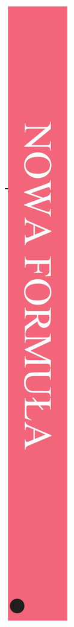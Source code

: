 \documentclass[10pt]{article}
\begin{document}
\begin{enumerate}
\includegraphics[max width=\textwidth, center]{2024_11_21_3120cbc7edd07b3a101fg-01(2)}

\end{enumerate}
\end{document}
